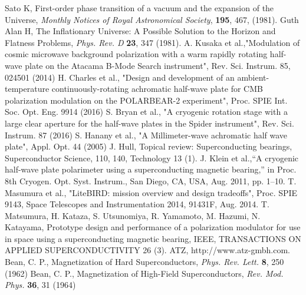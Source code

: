 \documentclass[iournal]{IEEEtran}
\begin{document}
%
%
%
\begin{thebibliography}{99}

Sato K, First-order phase transition of a vacuum and the expansion of the Universe, {\it Monthly Notices of Royal Astronomical Society}, {\bf 195}, 467, (1981).
Guth Alan H, The Inflationary Universe: A Possible Solution to the Horizon and Flatness Problems, {\it Phys. Rev. D} {\bf 23}, 347 (1981).
A. Kusaka et al.,"Modulation of cosmic microwave background polarization with a warm rapidly rotating half-wave plate on the Atacama B-Mode Search instrument", Rev. Sci. Instrum. 85, 024501 (2014)
H. Charles et al., "Design and development of an ambient-temperature continuously-rotating achromatic half-wave plate for CMB polarization modulation on the POLARBEAR-2 experiment", Proc. SPIE Int. Soc. Opt. Eng. 9914 (2016)
S. Bryan et al., "A cryogenic rotation stage with a large clear aperture for the half-wave plates in the Spider instrument", Rev. Sci. Instrum. 87 (2016)
S. Hanany et al., "A Millimeter-wave achromatic half wave plate", Appl. Opt. 44 (2005)
J. Hull, Topical review: Superconducting bearings, Superconductor Science, 110, 140, Technology 13 (1).
J. Klein et al.,“A cryogenic half-wave plate polarimeter using a superconducting magnetic bearing,” in Proc. 8th Cryogen. Opt. Syst. Instrum., San Diego, CA, USA, Aug. 2011, pp. 1–10.
T. Masumura et al., "LiteBIRD: mission overview and design tradeoffs", Proc. SPIE 9143, Space Telescopes and Instrumentation 2014, 91431F, Aug. 2014.
T. Matsumura, H. Kataza, S. Utsunomiya, R. Yamamoto, M. Hazumi, N. Katayama, Prototype design and performance of a polarization modulator for use in space using a superconducting magnetic bearing, IEEE, TRANSACTIONS ON APPLIED SUPERCONDUCTIVITY 26 (3).
ATZ, http://www.atz-gmbh.com.
Bean, C. P., Magnetization of Hard Superconductors, {\em Phys. Rev. Lett.\/} {\bf 8}, 250 (1962)
Bean, C. P., Magnetization of High-Field Superconductors, {\em Rev. Mod. Phys.\/} {\bf 36}, 31 (1964)
\end{thebibliography}
\end{document}
